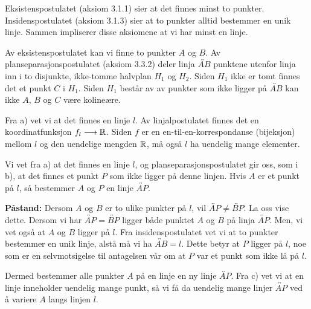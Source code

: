\begin{oppgave}[3.7.2]
\begin{punkt}
    Eksistenspostulatet (aksiom 3.1.1) sier at det finnes minst to punkter. 
    Insidenspostulatet (aksiom 3.1.3) sier at to punkter alltid bestemmer en unik linje. 
    Sammen impliserer disse aksiomene at vi har minst en linje. 
\end{punkt}

\begin{punkt}
    Av eksistenspostulatet kan vi finne to punkter $A$ og $B$. 
    Av planseparasjonspostulatet (aksiom 3.3.2) deler linja $\overleftrightarrow{AB}$ punktene utenfor linja inn i to disjunkte, ikke-tomme halvplan $H_1$ og $H_2$.
    Siden $H_1$ ikke er tomt finnes det et punkt $C$ i $H_1$. 
    Siden $H_1$ består av av punkter som ikke ligger på $\overleftrightarrow{AB}$ kan ikke $A$, $B$ og $C$ være kolineære.
\end{punkt}

\begin{punkt}
    Fra a) vet vi at det finnes en linje $l$. 
    Av linjalpostulatet finnes det en koordinatfunksjon $f_l\longrightarrow \mathbb{R}$. 
    Siden $f$ er en en-til-en-korrespondanse (bijeksjon) mellom $l$ og den uendelige mengden $\mathbb{R}$, må også $l$ ha uendelig mange elementer.
\end{punkt}

\begin{punkt}
    Vi vet fra a) at det finnes en linje $l$, og planseparasjonspostulatet gir oss, som i b), at det finnes et punkt $P$ som ikke ligger på denne linjen.
    Hvis $A$ er et punkt på $l$, så bestemmer $A$ og $P$ en linje $\overleftrightarrow{AP}$. 
    
    \textbf{Påstand:} Dersom $A$ og $B$ er to ulike punkter på $l$, vil $\overleftrightarrow{AP}\neq \overleftrightarrow{BP}$. 
    La oss vise dette. 
    Dersom vi har $\overleftrightarrow{AP} = \overleftrightarrow{BP}$ ligger både punktet $A$ og $B$ på linja $\overleftrightarrow{AP}$. 
    Men, vi vet også at $A$ og $B$ ligger på $l$. 
    Fra insidenspostulatet vet vi at to punkter bestemmer en unik linje, alstå må vi ha $\overleftrightarrow{AB}=l$. 
    Dette betyr at $P$ ligger på $l$, noe som er en selvmotsigelse til antagelsen vår om at $P$ var et punkt som ikke lå på $l$. 

    Dermed bestemmer alle punkter $A$ på en linje en ny linje $\overleftrightarrow{AP}$.
    Fra c) vet vi at en linje inneholder uendelig mange punkt, så vi få da uendelig mange linjer $\overleftrightarrow{AP}$ ved å variere $A$ langs linjen $l$.
\end{punkt}


\end{oppgave}
